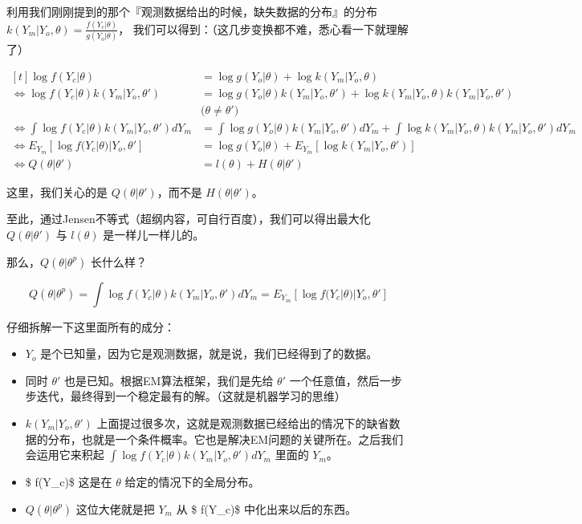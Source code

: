 \documentclass[11pt]{article}
\begin{document}
利用我们刚刚提到的那个『观测数据给出的时候，缺失数据的分布』的分布
\(k(Y_m | Y_o, \theta) =\frac{f(Y_c|\theta)}{g(Y_o |\theta)}\)，
我们可以得到：（这几步变换都不难，悉心看一下就理解了）

\[\begin{aligned}[t] \log f(Y_c|\theta) &= \log g(Y_o|\theta) + \log k(Y_m|Y_o,\theta) \\ \Leftrightarrow \log f(Y_c|\theta) k(Y_m|Y_o,\theta') &= \log g(Y_o|\theta) k(Y_m|Y_o,\theta')+ \log k(Y_m|Y_o,\theta) k(Y_m|Y_o,\theta') \\ &\text{(}\theta \neq \theta' \text{)} \\ \Leftrightarrow \int \log f(Y_c|\theta) k(Y_m|Y_o,\theta') dY_m&= \int \log g(Y_o|\theta) k(Y_m|Y_o,\theta') dY_m+ \int \log k(Y_m|Y_o,\theta) k(Y_m|Y_o,\theta') dY_m \\ \Leftrightarrow E_{Y_m} [\log f(Y_c|\theta) | Y_o, \theta'] &= \log g(Y_o|\theta) + E_{Y_m} [\log k(Y_m|Y_o,\theta')] \\ \Leftrightarrow Q(\theta| \theta') &= l(\theta) + H(\theta | \theta') \end{aligned}\]

这里，我们关心的是 \(Q(\theta | \theta')\)，而不是
\(H(\theta|\theta')\)。

至此，通过Jensen不等式（超纲内容，可自行百度），我们可以得出最大化
\(Q(\theta|\theta')\) 与 \(l(\theta)\) 是一样儿一样儿的。

那么，\(Q(\theta | \theta^{p})\) 长什么样？

\[Q(\theta | \theta^{p}) =\int \log f(Y_c|\theta) k(Y_m|Y_o,\theta') dY_m = E_{Y_m} [\log f(Y_c|\theta) | Y_o, \theta']\]

仔细拆解一下这里面所有的成分：

\begin{itemize}
\item
  \(Y_o\) 是个已知量，因为它是观测数据，就是说，我们已经得到了的数据。
\item
  同时 \(\theta'\) 也是已知。根据EM算法框架，我们是先给 \(\theta'\)
  一个任意值，然后一步步迭代，最终得到一个稳定最有的解。（这就是机器学习的思维）
\item
  \(k(Y_m|Y_o,\theta')\)
  上面提过很多次，这就是观测数据已经给出的情况下的缺省数据的分布，也就是一个条件概率。它也是解决EM问题的关键所在。之后我们会运用它来积起
  \(\int \log f(Y_c|\theta) k(Y_m|Y_o,\theta') dY_m\) 里面的 \(Y_m\)。
\item
  \$ \log f(Y\_c\textbar{}\theta)\$ 这是在 \(\theta\)
  给定的情况下的全局分布。
\item
  \(Q(\theta | \theta^{p})\) 这位大佬就是把 \(Y_m\) 从 \$
  \log f(Y\_c\textbar{}\theta)\$ 中化出来以后的东西。
\end{itemize}
\end{document}
